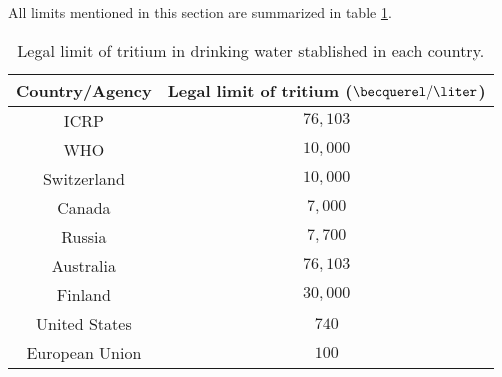 All limits mentioned in this section are summarized in table \ref{tab:LegalLimitTritium}.

\begin{table}[htbp]
\begin{center}
\begin{tabular}{|c|c|}
\hline
Country/Agency & Legal limit of tritium ($\becquerel/\liter$)\\
\hline \hline \hline
ICRP & $76,103$ \\ \hline
WHO & $10,000$ \\ \hline
Switzerland & $10,000$ \\ \hline
Canada & $7,000$ \\ \hline
Russia & $7,700$ \\ \hline
Australia & $76,103$ \\ \hline
Finland & $30,000$ \\ \hline
United States & $740$ \\ \hline
European Union & $100$ \\ \hline
\end{tabular}
\caption{Legal limit of tritium in drinking water stablished in each country.}
\label{tab:LegalLimitTritium}
\end{center}
\end{table}